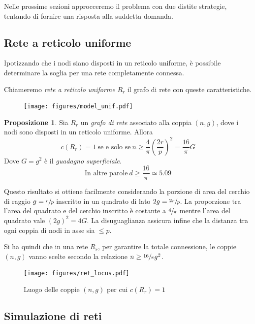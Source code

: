 \documentclass[a4paper,12pt]{article}
\theoremstyle{definition}
\newtheorem{proposition}{Proposizione}
\begin{document}
Nelle prossime sezioni approcceremo il problema con due distite strategie, tentando di fornire una risposta alla suddetta domanda.

\subsection{Rete a reticolo uniforme}

Ipotizzando che i nodi siano disposti in un reticolo uniforme, è possibile determinare la soglia per una rete completamente connessa.

Chiameremo \emph{rete a reticolo uniforme} $R_r$ il grafo di rete con queste caratteristiche.

\begin{figure}[H]
\centering
\texttt{[image: figures/model\_unif.pdf]}
\caption{}
\end{figure}

\begin{proposition}
Sia $R_r$ un \emph{grafo di rete} associato alla coppia $(n, g)$, dove i nodi sono disposti in un reticolo uniforme. Allora
\begin{equation*}
c(R_r) = 1 \ \text{se e solo se} \ n \geq \frac{4}{\pi} \left(\frac{2r}{p}\right)^2 = \frac{16}{\pi} G
\end{equation*}
Dove $G = g^2$ è il \emph{guadagno superficiale}.
\begin{equation*}
\text{In altre parole} \ d \geq \frac{16}{\pi} \simeq 5.09
\end{equation*}
\end{proposition}

Questo risultato si ottiene facilmente considerando la porzione di area del cerchio di raggio $g = \sfrac{r}{p}$ inscritto in un quadrato di lato $2g = \sfrac{2r}{p}$. La proporzione tra l'area del quadrato e del cerchio inscritto è costante a $\sfrac{4}{\pi}$ mentre l'area del quadrato vale $(2g)^2 = 4G$. La disuguaglianza assicura infine che la distanza tra ogni coppia di nodi in asse sia $\leq p$.

Si ha quindi che in una rete $R_r$, per garantire la totale connessione, le coppie $(n, g)$ vanno scelte secondo la relazione $n \geq \sfrac{16}{\pi} g^2$.

\begin{figure}[H]
\centering
\texttt{[image: figures/ret\_locus.pdf]}
\caption{Luogo delle coppie $(n, g)$ per cui $c(R_r) = 1$}
\end{figure}

\subsection{Simulazione di reti}
\end{document}
